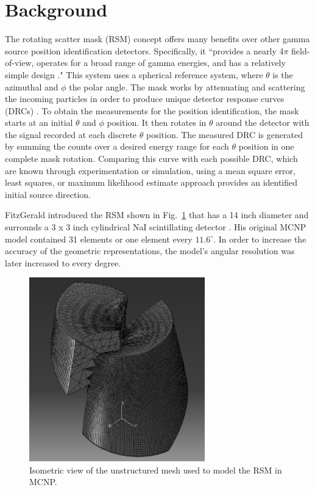 \documentclass[3p,times]{elsarticle}
\begin{document}
\section{Background}
The rotating scatter mask (RSM) concept offers many benefits over other gamma source position identification detectors.  
Specifically, it ``provides a nearly 4$\pi$ field-of-view, operates for a broad range of gamma energies, and has a relatively simple design \cite{Logan2017}." 
This system uses a spherical reference system, where $\theta$ is the azimuthal and $\phi$ the polar angle.  
The mask works by attenuating and scattering the incoming particles in order to produce unique detector response curves (DRCs) \cite{Logan2017}.  
To obtain the measurements for the position identification, the mask starts at an initial $\theta$ and $\phi$ position.
It then rotates in $\theta$ around the detector with the signal recorded at each discrete $\theta$ position.  
The measured DRC is generated by summing the counts over a desired energy range for each $\theta$ position in one complete mask rotation.  
Comparing this curve with each possible DRC, which are known through experimentation or simulation, using a mean square error, least squares, or maximum likelihood estimate approach provides an identified initial source direction.

FitzGerald introduced the RSM shown in Fig.~\ref{fig:RSM} that has a 14 inch diameter and surrounds a 3 x 3 inch cylindrical NaI scintillating detector \cite{FitzGerald2015}. 
His original MCNP model contained 31 elements or one element every $11.6^\circ$.  
In order to increase the accuracy of the geometric representations,  the model's angular resolution was later increased to every degree.  

\begin{figure}[ht!]
\includegraphics[width={3.0in}]{../figs/P2AtIso.pdf}
\centering
\caption{Isometric view of the unstructured mesh used to model the RSM in MCNP.}
\label{fig:RSM}
\end{figure}
\end{document}
